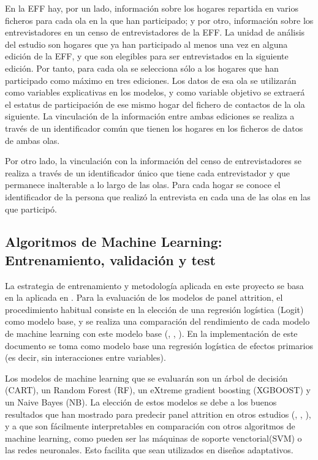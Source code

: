 En la EFF hay, por un lado, información sobre los hogares repartida en varios ficheros para cada ola en la que han participado; y por otro, información sobre los entrevistadores en un censo de entrevistadores de la EFF. La unidad de análisis del estudio son hogares que ya han participado al menos una vez en alguna edición de la EFF, y que son elegibles para ser entrevistados en la siguiente edición. Por tanto, para cada ola se selecciona sólo a los hogares que han participado como máximo en tres ediciones. Los datos de esa ola se utilizarán como variables explicativas en los modelos, y como variable objetivo se extraerá el estatus de participación de ese mismo hogar del fichero de contactos de la ola siguiente. La vinculación de la información entre ambas ediciones se realiza a través de un identificador común que tienen los hogares en los ficheros de datos de ambas olas.

Por otro lado, la vinculación con la información del censo de entrevistadores se realiza a través de un identificador único que tiene cada entrevistador y que permanece inalterable a lo largo de las olas. Para cada hogar se conoce el identificador de la persona que realizó la entrevista en cada una de las olas en las que participó.

\subsection{Algoritmos de Machine Learning: Entrenamiento, validación y test}

La estrategia de entrenamiento y metodología aplicada en este proyecto se basa en la aplicada en \cite{beste2023case}. Para la evaluación de los modelos de panel attrition, el procedimiento habitual consiste en la elección de una regresión logística (Logit) como modelo base, y se realiza una comparación del rendimiento de cada modelo de machine learning con este modelo base (\cite{lepkowski2002nonresponse}, \cite{kern2021predicting}, \cite{beste2023case}). En la implementación de este documento se toma como modelo base una regresión logística de efectos primarios (es decir, sin interacciones entre variables).

Los modelos de machine learning que se evaluarán son un árbol de decisión (CART), un Random Forest (RF), un eXtreme gradient boosting (XGBOOST) y un Naive Bayes (NB). La elección de estos modelos se debe a los buenos resultados que han mostrado para predecir panel attrition en otros estudios (\cite{kern2019tree}, \cite{kern2021predicting}, \cite{beste2023case}), y a que son fácilmente interpretables en comparación con otros algoritmos de machine learning, como pueden ser las máquinas de soporte venctorial(SVM) o las redes neuronales. Esto facilita que sean utilizados en diseños adaptativos.

